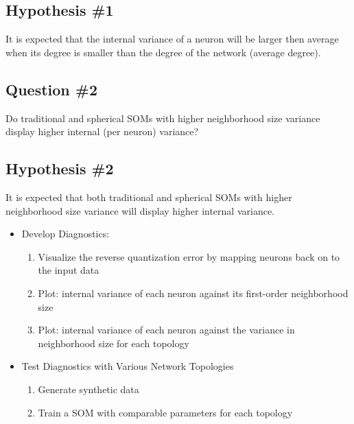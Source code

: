 \documentclass[10pt,titlepage]{article}
\begin{document}
\subsection{Hypothesis \#1}
It is expected that the internal variance of a neuron will be larger then
average when its degree is smaller than the degree of the network (average
degree).

\subsection{Question \#2}
Do traditional and spherical SOMs with higher neighborhood size variance 
display higher internal (per neuron) variance?
\subsection{Hypothesis \#2}
It is expected that both traditional and spherical SOMs with higher neighborhood
size variance will display higher internal variance.


\begin{itemize}
	\item Develop Diagnostics:
	\begin{enumerate}
		\item Visualize the reverse quantization error by mapping neurons back on to the input data
    		\item Plot: internal variance of each neuron against its first-order neighborhood size
		\item Plot: internal variance of each neuron against the variance in neighborhood size for each topology
	\end{enumerate}
	\item Test Diagnostics with Various Network Topologies
	\begin{enumerate}
    		\item Generate synthetic data
    		\item Train a SOM with comparable parameters for each topology
	\end{enumerate}
\end{itemize}
\end{document}
